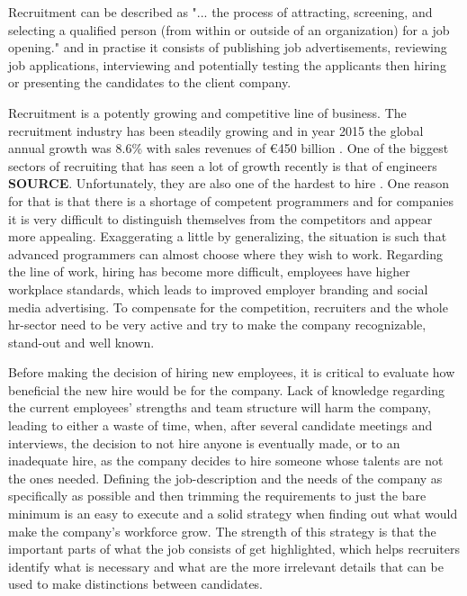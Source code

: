 \documentclass[11pt,a4paper,oneside,article]{memoir}
\begin{document}
Recruitment can be described as "... the process of attracting, screening, and selecting a qualified person (from within or outside of an organization) for a job opening." \cite[p.~1]{konceptanalytics:book} and in practise it consists of publishing job advertisements, reviewing job applications, interviewing and potentially testing the applicants then hiring or presenting the candidates to the client company.

Recruitment is a potently growing and competitive line of business. The recruitment industry has been steadily growing and in year 2015 the global annual growth was 8.6\% with sales revenues of €450 billion \cite{ciett:economic}. One of the biggest sectors of recruiting that has seen a lot of growth recently is that of engineers \textbf{SOURCE}. Unfortunately, they are also one of the hardest to hire \cite[p.~7]{wef:jobs} \cite{elliot:blog}. One reason for that is that there is a shortage of competent programmers and for companies it is very difficult to distinguish themselves from the competitors and appear more appealing. Exaggerating a little by generalizing, the situation is such that advanced programmers can almost choose where they wish to work. Regarding the line of work, hiring has become more difficult, employees have higher workplace standards, which leads to improved employer branding and social media advertising. To compensate for the competition, recruiters and the whole \gls{hr}-sector need to be very active and try to make the company recognizable, stand-out and well known.

Before making the decision of hiring new employees, it is critical to evaluate how beneficial the new hire would be for the company. Lack of knowledge regarding the current employees' strengths and team structure will harm the company, leading to either a waste of time, when, after several candidate meetings and interviews, the decision to not hire anyone is eventually made, or to an inadequate hire, as the company decides to hire someone whose talents are not the ones needed. Defining the job-description and the needs of the company as specifically as possible and then trimming the requirements to just the bare minimum is an easy to execute and a solid strategy when finding out what would make the company's workforce grow. The strength of this strategy is that the important parts of what the job consists of get highlighted, which helps recruiters identify what is necessary and what are the more irrelevant details that can be used to make distinctions between candidates.
\end{document}
